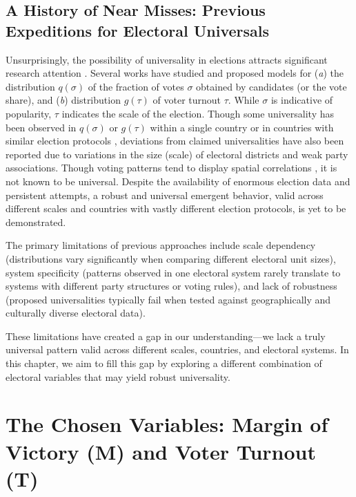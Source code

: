 \subsection{A History of Near Misses: Previous Expeditions for Electoral Universals}

Unsurprisingly, the possibility of universality in elections attracts significant research attention \cite{CosAlmAnd1999, ForCas2007, BorBou2010, mantovani2011scaling, BokSzaVat2018, ChaMitFor2013, hosel2019universality}. Several works have studied and proposed models for ({\it a}) the distribution $q(\sigma)$ of the fraction of votes $\sigma$ obtained by candidates (or the vote share), and ({\it b}) distribution $g(\tau)$ of voter turnout $\tau$. While $\sigma$ is indicative of popularity, $\tau$ indicates the scale of the election. Though some universality has been observed in $q(\sigma)$ or $g(\tau)$ within a single country \cite{ForCas2007,CosAlmAnd1999, BorBou2010} or in countries with similar election protocols \cite{ForCas2007, ChaMitFor2013}, deviations from claimed universalities have also been reported \cite{ChaMitFor2013, Kon2017,Kon2019, CalCroAnt2015, BorRayBou2012} due to variations in the size (scale) of electoral districts and weak party associations. Though voting patterns tend to display spatial correlations \cite{FerSucRam2014, BraDeA2017,MicIlkAtt2021,MorHisNak2019}, it is not known to be universal. Despite the availability of enormous election data and persistent attempts, a robust and universal emergent behavior, valid across different scales and countries with vastly different election protocols, is yet to be demonstrated.

The primary limitations of previous approaches include scale dependency (distributions vary significantly when comparing different electoral unit sizes), system specificity (patterns observed in one electoral system rarely translate to systems with different party structures or voting rules), and lack of robustness (proposed universalities typically fail when tested against geographically and culturally diverse electoral data).

These limitations have created a gap in our understanding—we lack a truly universal pattern valid across different scales, countries, and electoral systems. In this chapter, we aim to fill this gap by exploring a different combination of electoral variables that may yield robust universality.

\section{The Chosen Variables: Margin of Victory (M) and Voter Turnout (T)}

